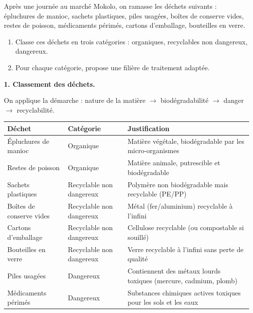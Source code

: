 \documentclass[11pt]{article}
\begin{document}
\begin{exoresolu}
Après une journée au marché Mokolo, on ramasse les déchets suivants : épluchures de manioc, sachets plastiques, piles usagées, boîtes de conserve vides, restes de poisson, médicaments périmés, cartons d'emballage, bouteilles en verre.
\begin{enumerate}
\item Classe ces déchets en trois catégories : organiques, recyclables non dangereux, dangereux.
\item Pour chaque catégorie, propose une filière de traitement adaptée.
\end{enumerate}
\tcblower
\textbf{1. Classement des déchets.}

On applique la démarche : nature de la matière $\rightarrow$ biodégradabilité $\rightarrow$ danger $\rightarrow$ recyclabilité.

\begin{center}
\begin{tabularx}{\linewidth}{|l|X|X|}
\hline
\rowcolor{popblueL} \textbf{Déchet} & \textbf{Catégorie} & \textbf{Justification} \\
\hline
Épluchures de manioc & Organique & Matière végétale, biodégradable par les micro-organismes \\
\hline
Restes de poisson & Organique & Matière animale, putrescible et biodégradable \\
\hline
Sachets plastiques & Recyclable non dangereux & Polymère non biodégradable mais recyclable (PE/PP) \\
\hline
Boîtes de conserve vides & Recyclable non dangereux & Métal (fer/aluminium) recyclable à l'infini \\
\hline
Cartons d'emballage & Recyclable non dangereux & Cellulose recyclable (ou compostable si souillé) \\
\hline
Bouteilles en verre & Recyclable non dangereux & Verre recyclable à l'infini sans perte de qualité \\
\hline
Piles usagées & Dangereux & Contiennent des métaux lourds toxiques (mercure, cadmium, plomb) \\
\hline
Médicaments périmés & Dangereux & Substances chimiques actives toxiques pour les sols et les eaux \\
\hline
\end{tabularx}
\end{center}


\end{exoresolu}
\end{document}
